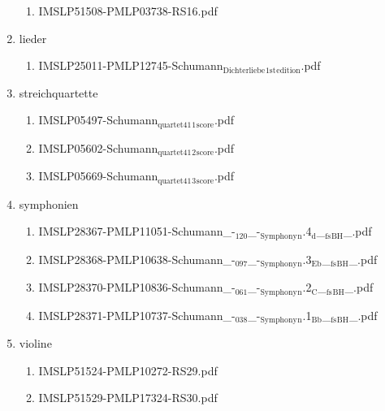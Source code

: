 \documentclass[11pt]{article}
\begin{document}
\begin{enumerate}
\begin{enumerate}
\item IMSLP51508-PMLP03738-RS16.pdf
\label{sec-1-1-1-1-44-61-6-2}
\end{enumerate}

\item lieder
\label{sec-1-1-1-1-44-61-7}
\begin{enumerate}
\item IMSLP25011-PMLP12745-Schumann$_{\text{Dichterliebe}}$$_{\text{1st}}$$_{\text{edition}}$.pdf
\label{sec-1-1-1-1-44-61-7-1}
\end{enumerate}

\item streichquartette
\label{sec-1-1-1-1-44-61-8}
\begin{enumerate}
\item IMSLP05497-Schumann$_{\text{quartet41}}$$_{\text{1}}$$_{\text{score}}$.pdf
\label{sec-1-1-1-1-44-61-8-1}

\item IMSLP05602-Schumann$_{\text{quartet41}}$$_{\text{2}}$$_{\text{score}}$.pdf
\label{sec-1-1-1-1-44-61-8-2}

\item IMSLP05669-Schumann$_{\text{quartet41}}$$_{\text{3}}$$_{\text{score}}$.pdf
\label{sec-1-1-1-1-44-61-8-3}
\end{enumerate}

\item symphonien
\label{sec-1-1-1-1-44-61-9}
\begin{enumerate}
\item IMSLP28367-PMLP11051-Schumann\_-$_{\text{120}}$\_-$_{\text{Symphony}}$$_{\text{n}}$.4$_{\text{d}}$\_$_{\text{fs}}$$_{\text{BH}}$\_.pdf
\label{sec-1-1-1-1-44-61-9-1}

\item IMSLP28368-PMLP10638-Schumann\_-$_{\text{097}}$\_-$_{\text{Symphony}}$$_{\text{n}}$.3$_{\text{Eb}}$\_$_{\text{fs}}$$_{\text{BH}}$\_.pdf
\label{sec-1-1-1-1-44-61-9-2}

\item IMSLP28370-PMLP10836-Schumann\_-$_{\text{061}}$\_-$_{\text{Symphony}}$$_{\text{n}}$.2$_{\text{C}}$\_$_{\text{fs}}$$_{\text{BH}}$\_.pdf
\label{sec-1-1-1-1-44-61-9-3}

\item IMSLP28371-PMLP10737-Schumann\_-$_{\text{038}}$\_-$_{\text{Symphony}}$$_{\text{n}}$.1$_{\text{Bb}}$\_$_{\text{fs}}$$_{\text{BH}}$\_.pdf
\label{sec-1-1-1-1-44-61-9-4}
\end{enumerate}

\item violine
\label{sec-1-1-1-1-44-61-10}
\begin{enumerate}
\item IMSLP51524-PMLP10272-RS29.pdf
\label{sec-1-1-1-1-44-61-10-1}

\item IMSLP51529-PMLP17324-RS30.pdf
\label{sec-1-1-1-1-44-61-10-2}
\end{enumerate}
\end{enumerate}
\end{document}
